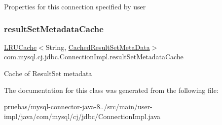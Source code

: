 Properties for this connection specified by user \mbox{\label{classcom_1_1mysql_1_1cj_1_1jdbc_1_1_connection_impl_a270646fc06e81a7f33f830a9b0d04aea}} 
\subsubsection{\texorpdfstring{result\+Set\+Metadata\+Cache}{resultSetMetadataCache}}
{\footnotesize\ttfamily \mbox{\hyperlink{classcom_1_1mysql_1_1cj_1_1util_1_1_l_r_u_cache}{L\+R\+U\+Cache}}$<$String, \mbox{\hyperlink{interfacecom_1_1mysql_1_1cj_1_1jdbc_1_1result_1_1_cached_result_set_meta_data}{Cached\+Result\+Set\+Meta\+Data}}$>$ com.\+mysql.\+cj.\+jdbc.\+Connection\+Impl.\+result\+Set\+Metadata\+Cache\hspace{0.3cm}{\ttfamily [protected]}}

Cache of Result\+Set metadata 

The documentation for this class was generated from the following file\+:\begin{DoxyCompactItemize}
\item 
pruebas/mysql-\/connector-\/java-\/8../src/main/user-\/impl/java/com/mysql/cj/jdbc/Connection\+Impl.\+java\end{DoxyCompactItemize}

